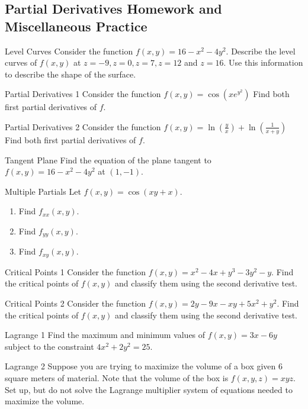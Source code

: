 \renewcommand\thesubsection{\thesection.\Alph{subsection}}
\setcounter{subsection}{17}
\subsection{Partial Derivatives Homework and Miscellaneous Practice}

\begin{exercise}{Level Curves}
Consider the function $f(x,y)=16-x^2-4y^2$. Describe the level curves of $f(x,y)$ at $z=-9, z=0, z=7, z=12$ and $z=16$. Use this information to describe the shape of the surface.  
\end{exercise}

\begin{pexercise}{Partial Derivatives 1}%
Consider the function $f(x,y)=\cos(xe^{y^2})$ Find both first partial derivatives of $f$.
\end{pexercise}

\begin{pexercise}{Partial Derivatives 2}%
Consider the function $f(x,y)=\ln\left(\frac{y}{x}\right)+\ln\left(\frac{1}{x+y}\right)$ Find both first partial derivatives of $f$.
\end{pexercise}

\begin{exercise}{Tangent Plane}
Find the equation of the plane tangent to $f(x,y)=16-x^2-4y^2$ at $(1,-1)$.
\end{exercise}

\begin{exercise}{Multiple Partials}
Let $f(x,y)=\cos(xy+x)$.
\begin{enumerate}
\item Find $f_{xx}(x,y)$.
\item Find $f_{yy}(x,y)$.
\item Find $f_{xy}(x,y)$.
\end{enumerate}
\end{exercise}

\begin{exercise}{Critical Points 1}
Consider the function $f(x,y)=x^2-4x+y^3-3y^2-y$. Find the critical points of $f(x,y)$ and classify them using the second derivative test.
\end{exercise}

\begin{pexercise}{Critical Points 2}%
Consider the function $f(x,y)=2y-9x-xy+5x^2+y^2$. Find the critical points of $f(x,y)$ and classify them using the second derivative test.
\end{pexercise}

\begin{pexercise}{Lagrange 1}%
Find the maximum and minimum values of $f(x,y)=3x-6y$ subject to the constraint $4x^2+2y^2=25$.
\end{pexercise}

\begin{exercise}{Lagrange 2}
Suppose you are trying to maximize the volume of a box given 6 square meters of material. Note that the volume of the box is $f(x,y,z)=xyz$. Set up, but do not solve the Lagrange multiplier system of equations needed to maximize the volume.
\end{exercise}
\renewcommand\thesubsection{\thesection.\arabic{subsection}}